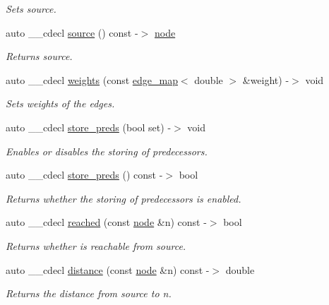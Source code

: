 \begin{DoxyCompactItemize}
\begin{DoxyCompactList}\small\item\em Sets source. \end{DoxyCompactList}\item 
auto \+\_\+\+\_\+cdecl \mbox{\hyperlink{classbellman__ford_a3645ee2843ff63ef2538047a8f49d1f0}{source}} () const -\/$>$ \mbox{\hyperlink{classnode}{node}}
\begin{DoxyCompactList}\small\item\em Returns source. \end{DoxyCompactList}\item 
auto \+\_\+\+\_\+cdecl \mbox{\hyperlink{classbellman__ford_aecf5bf7eb9c1ccd4be263ea1f7fe4690}{weights}} (const \mbox{\hyperlink{classedge__map}{edge\+\_\+map}}$<$ double $>$ \&weight) -\/$>$ void
\begin{DoxyCompactList}\small\item\em Sets weights of the edges. \end{DoxyCompactList}\item 
auto \+\_\+\+\_\+cdecl \mbox{\hyperlink{classbellman__ford_ab45cad1c97e011053efe6382f99b6cda}{store\+\_\+preds}} (bool set) -\/$>$ void
\begin{DoxyCompactList}\small\item\em Enables or disables the storing of predecessors. \end{DoxyCompactList}\item 
auto \+\_\+\+\_\+cdecl \mbox{\hyperlink{classbellman__ford_ada19ef3d00b9377fa643775e103cbd2e}{store\+\_\+preds}} () const -\/$>$ bool
\begin{DoxyCompactList}\small\item\em Returns whether the storing of predecessors is enabled. \end{DoxyCompactList}\item 
auto \+\_\+\+\_\+cdecl \mbox{\hyperlink{classbellman__ford_adb6717e842fbdc6501879eb798cc2030}{reached}} (const \mbox{\hyperlink{classnode}{node}} \&n) const -\/$>$ bool
\begin{DoxyCompactList}\small\item\em Returns whether is reachable from source. \end{DoxyCompactList}\item 
auto \+\_\+\+\_\+cdecl \mbox{\hyperlink{classbellman__ford_a33208125fd0b500ae0ce5cab1ef4e3c1}{distance}} (const \mbox{\hyperlink{classnode}{node}} \&n) const -\/$>$ double
\begin{DoxyCompactList}\small\item\em Returns the distance from source to {\itshape n}. \end{DoxyCompactList}\item 

\end{DoxyCompactItemize}

